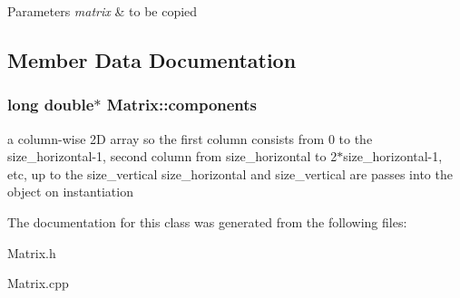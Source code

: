 \begin{DoxyParams}{Parameters}
{\em matrix} & to be copied \\
\hline
\end{DoxyParams}


\subsection{Member Data Documentation}
\hypertarget{classMatrix_a015689e10a280ad83d55dc24a9d015e2}{
\subsubsection[{components}]{\setlength{\rightskip}{0pt plus 5cm}long double$\ast$ Matrix\-::components}}\label{classMatrix_a015689e10a280ad83d55dc24a9d015e2}
a column-\/wise 2\-D array so the first column consists from 0 to the size\-\_\-horizontal-\/1, second column from size\-\_\-horizontal to 2$\ast$size\-\_\-horizontal-\/1, etc, up to the size\-\_\-vertical size\-\_\-horizontal and size\-\_\-vertical are passes into the object on instantiation 

The documentation for this class was generated from the following files\-:\begin{DoxyCompactItemize}
\item 
Matrix.\-h\item 
Matrix.\-cpp\end{DoxyCompactItemize}
